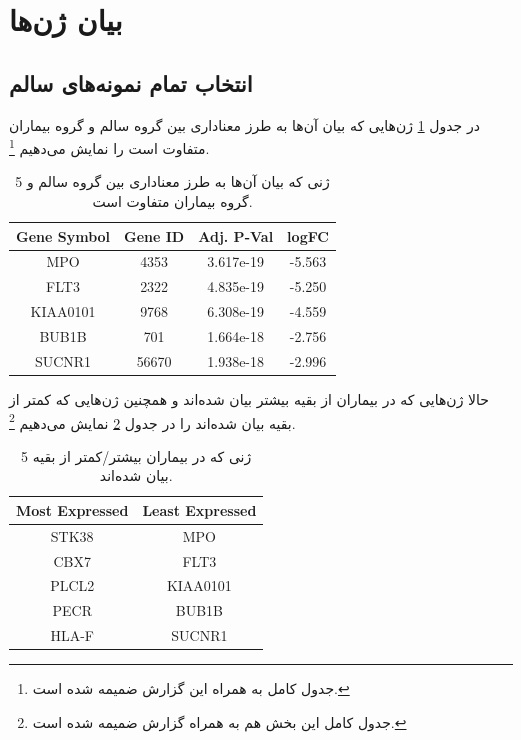 \documentclass{article}
\begin{document}
\section{بیان ژن‌ها}
\subsection{انتخاب تمام نمونه‌های سالم}
در جدول \ref{tab:genes} ژن‌هایی که بیان آن‌ها به طرز معناداری بین گروه سالم و گروه بیماران متفاوت است را نمایش می‌دهیم
\footnote{جدول کامل به همراه این گزارش ضمیمه شده است.}.

\begin{table}[h!]
	\begin{latin}
		\begin{center}
			\begin{tabular}{@{}cccc@{}}
				\toprule
				Gene Symbol & Gene ID & Adj. P-Val & logFC  \\ \midrule
				MPO         & 4353    & 3.617e-19 & -5.563 \\
				FLT3        & 2322    & 4.835e-19 & -5.250 \\
				KIAA0101    & 9768    & 6.308e-19 & -4.559 \\
				BUB1B       & 701     & 1.664e-18 & -2.756 \\
				SUCNR1      & 56670   & 1.938e-18 & -2.996 \\ \bottomrule
			\end{tabular}
		\end{center}
	\end{latin}
	\caption{5 ژنی که بیان آن‌ها به طرز معناداری بین گروه سالم و گروه بیماران متفاوت است.}
	\label{tab:genes}
\end{table}

حالا ژن‌هایی که در بیماران از بقیه بیشتر بیان شده‌اند و همچنین ژن‌هایی که کمتر از بقیه بیان شده‌اند را در جدول \ref{tab:up-down} نمایش می‌دهیم
\footnote{جدول کامل این بخش هم به همراه گزارش ضمیمه شده است.}.

\begin{table}[h!]
	\begin{latin}
		\begin{center}
			\begin{tabular}{@{}cc@{}}
				\toprule
				Most Expressed & Least Expressed \\ \midrule
				STK38          & MPO             \\
				CBX7           & FLT3            \\
				PLCL2          & KIAA0101        \\
				PECR           & BUB1B           \\
				HLA-F          & SUCNR1          \\ \bottomrule
			\end{tabular}
		\end{center}
	\end{latin}
	\caption{5 ژنی که در بیماران بیشتر/کمتر از بقیه بیان شده‌اند.}
	\label{tab:up-down}
\end{table}
\end{document}
